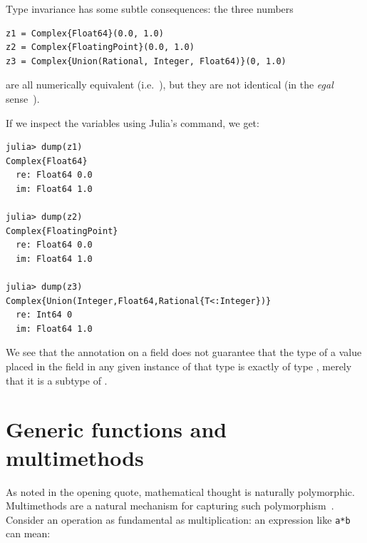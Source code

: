 \documentclass[pldi]{sigplanconf-pldi15}
\begin{document}
Type invariance has some subtle consequences: the three  numbers

\begin{lstlisting}
z1 = Complex{Float64}(0.0, 1.0)
z2 = Complex{FloatingPoint}(0.0, 1.0)
z3 = Complex{Union(Rational, Integer, Float64)}(0, 1.0)
\end{lstlisting}
%
are all numerically equivalent (i.e.\ ), but they are not
identical (in the \textit{egal} sense~\cite{Baker1993}).

If we inspect the variables using Julia's  command, we get:

\begin{lstlisting}
julia> dump(z1)
Complex{Float64} 
  re: Float64 0.0
  im: Float64 1.0

julia> dump(z2)
Complex{FloatingPoint} 
  re: Float64 0.0
  im: Float64 1.0

julia> dump(z3)
Complex{Union(Integer,Float64,Rational{T<:Integer})} 
  re: Int64 0
  im: Float64 1.0
\end{lstlisting}
%
We see that the  annotation on a field does not guarantee that the
type of a value placed in the field in any given instance of that type is
exactly of type , merely that it is a subtype of .




\section{Generic functions and multimethods}

As \cite{Poincare1908} noted in the opening quote, mathematical thought is
naturally polymorphic. Multimethods are a natural mechanism for capturing such
polymorphism~\cite{Bezanson2014b,Chen2014}. Consider an operation as
fundamental as multiplication: an expression like \verb|a*b| can mean:
\end{document}
